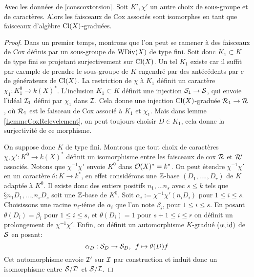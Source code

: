 \begin{thm}\label{InvarianceCoxTorsion}
Avec les données de \ref{conscoxtorsion}. Soit $K', \chi'$ un autre choix de sous-groupe et de caractères. Alors les faisceaux de Cox associés sont isomorphes en tant que faisceaux d'algèbre $\operatorname{Cl}(X)$-graduées.
\end{thm}
\begin{proof}
Dans un premier temps, montrons que l'on peut se ramener à des faisceaux de Cox définis par un sous-groupe de $\operatorname{WDiv}(X)$ de type fini. Soit donc $K_1\subset K$ de type fini se projetant surjectivement sur $\operatorname{Cl}(X)$. Un tel $K_1$ existe car il suffit par exemple de prendre le sous-groupe de $K$ engendré par des antécédents par $c$ de générateurs de $\operatorname{Cl}(X)$. La restriction de $\chi$ à $K_1$ définit un caractère $\chi_1:K_1^0\rightarrow k(X)^*$. L'inclusion $K_1\subset K$ définit une injection $\mathcal{S}_1\rightarrow \mathcal{S}$, qui envoie l'idéal $\mathcal{I}_1$ défini par $\chi_1$ dans $\mathcal{I}$. Cela donne une injection $\operatorname{Cl}(X)$-graduée $\mathcal{R}_1\rightarrow \mathcal{R}$, où $\mathcal{R}_1$ est le faisceau de Cox associé à $K_1$ et $\chi_1$. Mais dans lemme \ref{LemmeCoxRelevelement}, on peut toujours choisir $D\in K_1$, cela donne la surjectivité de ce morphisme.

On suppose donc $K$ de type fini. Montrons que tout choix de caractères $\chi,\chi':K^0\rightarrow k(X)^*$ définit un isomorphisme entre les faisceaux de cox $\mathcal{R}$ et $\mathcal{R}'$ associés. Notons que $\chi^{-1}\chi'$ envoie $K^0$ dans $\mathcal{O}(X)^*=k^*$. On peut étendre $\chi^{-1}\chi'$ en un caractère $\theta:K\rightarrow k^*$, en effet considérons une $\mathbb{Z}$-base $(D_1,....,D_r)$ de $K$ adaptée à $K^0$. Il existe donc des entiers positifs $n_1,...n_s$ avec $s\leq k$ tels que $§n_1D_1,...,n_sD_s$ soit une $\mathbb{Z}$-base de $K^0$. Soit $\alpha_i := \chi^{-1}\chi'(n_iD_i)$ pour $1\leq i\leq s$. Choisissons une racine $n_i$-iéme de $\alpha_i$ que l'on note $\beta_i$, pour $1\leq i\leq s$. En posant $\theta(D_i)=\beta_i$ pour $1\leq i\leq s$, et $\theta(D_i)=1$ pour $s+1\leq i\leq r$ on définit un prolongement de $\chi^{-1}\chi'$. Enfin, on définit un automorphisme $K$-gradué $(\alpha,\operatorname{id})$ de $\mathcal{S}$ en posant:
$$\alpha_D:\mathcal{S}_D\rightarrow \mathcal{S}_D,\,\,\, f\mapsto \theta(D)f$$
Cet automorphisme envoie $\mathcal{I}'$ sur $\mathcal{I}$ par construction et induit donc un isomorphisme entre $\mathcal{S}/\mathcal{I}'$ et $\mathcal{S}/\mathcal{I}$.


\end{proof}
